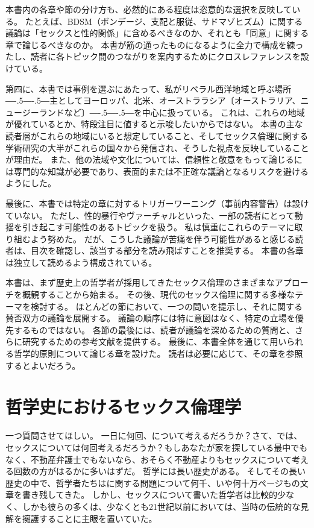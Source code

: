 \documentclass[paper=a4,book,openany]{jlreq}
\def\DDASH{―\kern-.5\zw―\kern-.5\zw―}
\begin{document}
本書内の各章や節の分け方も、必然的にある程度は恣意的な選択を反映している。
たとえば、BDSM（ボンデージ、支配と服従、サドマゾヒズム）に関する議論は「セックスと性的関係」に含めるべきなのか、それとも「同意」に関する章で論じるべきなのか。
本書が筋の通ったものになるように全力で構成を練ったし、読者に各トピック間のつながりを案内するためにクロスレファレンスを設けている。

第四に、本書では事例を選ぶにあたって、私がリベラル西洋地域と呼ぶ場所{\DDASH}主としてヨーロッパ、北米、オーストララシア〔オーストラリア、ニュージーランドなど〕{\DDASH}を中心に扱っている。
これは、これらの地域が優れているとか、特段注目に値すると示唆したいからではない。
本書の主な読者層がこれらの地域にいると想定していること、そしてセックス倫理に関する学術研究の大半がこれらの国々から発信され、そうした視点を反映していることが理由だ。
また、他の法域や文化については、信頼性と敬意をもって論じるには専門的な知識が必要であり、表面的または不正確な議論となるリスクを避けるようにした。

最後に、本書では特定の章に対するトリガーワーニング（事前内容警告）は設けていない。
ただし、性的暴行やヴァーチャルといった、一部の読者にとって動揺を引き起こす可能性のあるトピックを扱う。
私は慎重にこれらのテーマに取り組むよう努めた。
だが、こうした議論が苦痛を伴う可能性があると感じる読者は、目次を確認し、該当する部分を読み飛ばすことを推奨する。
本書の各章は独立して読めるよう構成されている。

本書は、まず歴史上の哲学者が採用してきたセックス倫理のさまざまなアプローチを概観することから始まる。
その後、現代のセックス倫理に関する多様なテーマを検討する。
ほとんどの節において、一つの問いを提示し、それに関する賛否双方の議論を展開する。
議論の順序には特に意図はなく、特定の立場を優先するものではない。
各節の最後には、読者が議論を深めるための質問と、さらに研究するための参考文献を提供する。
最後に、本書全体を通じて用いられる哲学的原則について論じる章を設けた。
読者は必要に応じて、その章を参照するとよいだろう。

\chapter{哲学史におけるセックス倫理学}

一つ質問させてほしい。
一日に何回、について考えるだろうか？さて、では、セックスについては何回考えるだろうか？もしあなたが家を探している最中でもなく、不動産弁護士でもないなら、おそらく不動産よりもセックスについて考える回数の方がはるかに多いはずだ。
哲学には長い歴史がある。
そしてその長い歴史の中で、哲学者たちはに関する問題について何千、いや何十万ページもの文章を書き残してきた。
しかし、セックスについて書いた哲学者は比較的少なく、しかも彼らの多くは、少なくとも21世紀以前においては、当時の伝統的な見解を擁護することに主眼を置いていた。
\end{document}
